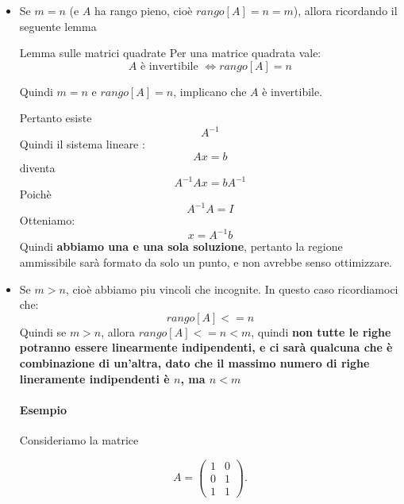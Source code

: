 \begin{itemize}
    \item Se $m = n$ (e $A$ ha rango pieno, cioè $rango[A] = n = m$), allora ricordando il seguente lemma
    \begin{lemma}{Lemma sulle matrici quadrate}
        Per una matrice quadrata vale:
        \begin{equation}
            A \text{ è invertibile } \Leftrightarrow rango[A] = n
        \end{equation}
    \end{lemma} 
    Quindi $m = n$ e $rango[A] = n$, implicano che $A$ è invertibile.

    Pertanto esiste
    \begin{equation}
        A^{-1}
    \end{equation}
    Quindi il sistema lineare :
    \begin{equation}
        Ax = b
    \end{equation}
    diventa
    \begin{equation}
        A^{-1}Ax = b A^{-1}
    \end{equation}
    Poichè
    \begin{equation}
        A^{-1}A = I
    \end{equation}
    Otteniamo:
    \begin{equation}
        x = A^{-1} b
    \end{equation}
    Quindi \textbf{abbiamo una e una sola soluzione}, pertanto la regione ammissibile sarà formato da solo un punto, e non avrebbe senso ottimizzare.
    \item Se $m > n$, cioè abbiamo piu vincoli che incognite.
    In questo caso ricordiamoci che:
    \begin{equation}
        rango[A] <= n
    \end{equation}
    Quindi se $m > n$, allora $rango[A] <= n < m$, quindi \textbf{non tutte le righe potranno essere linearmente indipendenti, e ci sarà qualcuna che è combinazione di un'altra,
    dato che il massimo numero di righe lineramente indipendenti è $n$, ma $n < m$}
    \paragraph{Esempio}

    Consideriamo la matrice

    $$
    A=
    \begin{pmatrix}
    1 & 0\\
    0 & 1\\
    1 & 1
    \end{pmatrix}.
    $$


\end{itemize}
